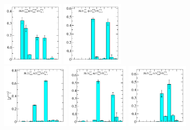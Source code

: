 \begin{figure}
  \includegraphics[width=0.28\textwidth]{figures/spectrum_a1g/with_tq/zfactors/zfactor_isodoublet_kaon_phi-A1g_1-P000-A1u-SS_0-P000-A1up-SS_0.pdf}
  \includegraphics[width=0.28\textwidth]{figures/spectrum_a1g/with_tq/zfactors/zfactor_isodoublet_kaon_phi-A1g_1-P001-A2-SS_1-P00-1-A2p-SS_1.pdf}\\
  \includegraphics[width=0.304\textwidth]{figures/spectrum_a1g/with_tq/zfactors/zfactor_isodoublet_kaon_pion-A1g_1-P011-A2-SS_0-P0-1-1-A2m-SS_0.pdf}
  \includegraphics[width=0.28\textwidth]{figures/spectrum_a1g/with_tq/zfactors/zfactor_isodoublet_kaon_eta-A1g_1-P001-A2-SS_1-P00-1-A2p-SS_1.pdf}
  \includegraphics[width=0.28\textwidth]{figures/spectrum_a1g/with_tq/zfactors/zfactor_isodoublet_kaon_pion-A1g_1-P111-A2-SS_0-P-1-1-1-A2m-SS_0.pdf}\\

\end{figure}
